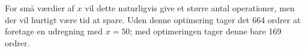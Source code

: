 \documentclass[12pt,a4paper]{article}
\begin{document}
For små værdier af $x$ vil dette naturligvis give et større antal operationer,
men der vil hurtigt være tid at spare. Uden denne optimering tager det 664
ordrer at foretage en udregning med $x=50$; med optimeringen tager denne bare
169 ordrer.
%
\end{document}
